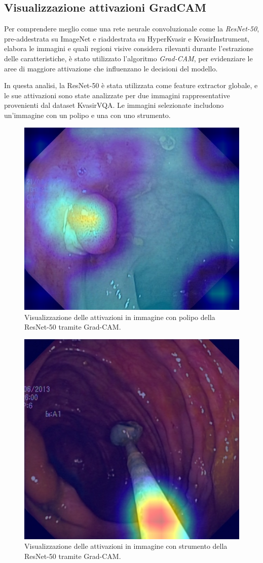 \documentclass[../main.tex]{subfiles}
\begin{document}
\subsection{Visualizzazione attivazioni GradCAM}

Per comprendere meglio come una rete neurale convoluzionale come la \textit{ResNet-50}, pre-addestrata su ImageNet e riaddestrata su HyperKvasir e KvasirInstrument, elabora le immagini e quali regioni visive considera rilevanti durante l'estrazione delle caratteristiche, è stato utilizzato l'algoritmo \textit{Grad-CAM}, per evidenziare le aree di maggiore attivazione che influenzano le decisioni del modello.

In questa analisi, la ResNet-50 è stata utilizzata come feature extractor globale, e le sue attivazioni sono state analizzate per due immagini rappresentative provenienti dal dataset KvasirVQA. Le immagini selezionate includono un'immagine con un polipo e una con uno strumento.

\begin{figure}[H]
    \centering
    \includegraphics[width=0.5\linewidth]{static/cam_image_polyp.jpg}
    \caption{Visualizzazione delle attivazioni in immagine con polipo della ResNet-50 tramite Grad-CAM.}
    \label{fig:gradcam-polyp}
\end{figure}

\begin{figure}[H]
    \centering
    \includegraphics[width=0.5\linewidth]{static/cam_image_instrument.jpg}
    \caption{Visualizzazione delle attivazioni in immagine con strumento della ResNet-50 tramite Grad-CAM.}
    \label{fig:gradcam-instrument}
\end{figure}
\end{document}
